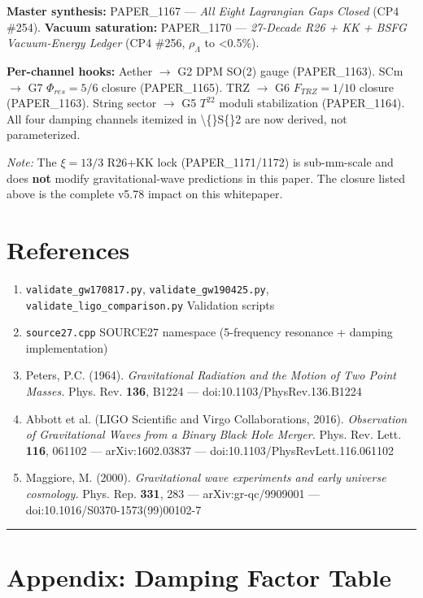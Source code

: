 \documentclass[11pt]{article}
\begin{document}
\textbf{Master synthesis:} PAPER\_1167 --- \emph{All Eight Lagrangian Gaps Closed} (CP4 \#254). \textbf{Vacuum saturation:} PAPER\_1170 --- \emph{27-Decade R26 + KK + BSFG Vacuum-Energy Ledger} (CP4 \#256, $\rho_\Lambda$ to <0.5\%).

\textbf{Per-channel hooks:} Aether $\to$ G2 DPM SO(2) gauge (PAPER\_1163). SCm $\to$ G7 $\Phi_{res}=5/6$ closure (PAPER\_1165). TRZ $\to$ G6 $F_{TRZ}=1/10$ closure (PAPER\_1163). String sector $\to$ G5 $T^{22}$ moduli stabilization (PAPER\_1164). All four damping channels itemized in \textbackslash\{\}S\{\}2 are now derived, not parameterized.

\emph{Note:} The $\xi=13/3$ R26+KK lock (PAPER\_1171/1172) is sub-mm-scale and does \textbf{not} modify gravitational-wave predictions in this paper. The closure listed above is the complete v5.78 impact on this whitepaper.

\section*{References}

\begin{enumerate}
  \item \verb|validate_gw170817.py|, \verb|validate_gw190425.py|, \verb|validate_ligo_comparison.py|  Validation scripts
  \item \verb|source27.cpp|  SOURCE27 namespace (5-frequency resonance + damping implementation)
  \item Peters, P.C. (1964). \emph{Gravitational Radiation and the Motion of Two Point Masses.} Phys. Rev. \textbf{136}, B1224 --- doi:10.1103/PhysRev.136.B1224
  \item Abbott et al. (LIGO Scientific and Virgo Collaborations, 2016). \emph{Observation of Gravitational Waves from a Binary Black Hole Merger.} Phys. Rev. Lett. \textbf{116}, 061102 --- arXiv:1602.03837 --- doi:10.1103/PhysRevLett.116.061102
  \item Maggiore, M. (2000). \emph{Gravitational wave experiments and early universe cosmology.} Phys. Rep. \textbf{331}, 283 --- arXiv:gr-qc/9909001 --- doi:10.1016/S0370-1573(99)00102-7
\end{enumerate}

\noindent\rule{\textwidth}{0.4pt}

\section*{Appendix: Damping Factor Table}
\end{document}
